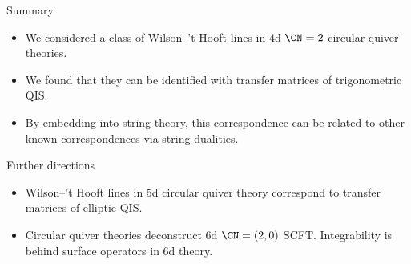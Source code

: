 \documentclass[t]{beamer}
\begin{document}
\begin{frame}
  Summary
  \begin{itemize}
  \item We considered a class of Wilson--'t Hooft lines in 4d
    $\CN = 2$ circular quiver theories.

  \item We found that they can be identified with transfer matrices of
    trigonometric QIS.

  \item By embedding into string theory, this correspondence can be
    related to other known correspondences via string dualities.
  \end{itemize}

  Further directions
  \begin{itemize}
  \item Wilson--'t Hooft lines in 5d circular quiver theory correspond
    to transfer matrices of elliptic QIS.

  \item Circular quiver theories deconstruct 6d $\CN = (2,0)$ SCFT.
    Integrability is behind surface operators in 6d theory.
  \end{itemize}
\end{frame}
\end{document}
